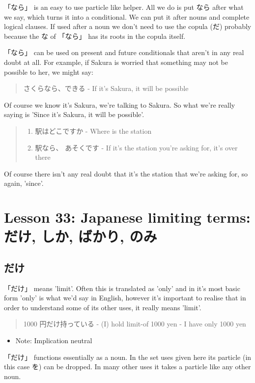 \documentclass[11pt]{article}
\begin{document}
「なら」 is an easy to use particle like helper. All we do is put なら after what we say, which turns it into a conditional. We can put it after nouns and complete logical clauses. If used after a noun we don't need to use the copula (だ) probably because the な of 「なら」 has its roots in the copula itself.

「なら」 can be used on present and future conditionals that aren't in any real doubt at all. For example, if Sakura is worried that something may not be possible to her, we might say:
\begin{quote}
さくらなら、できる - If it's Sakura, it will be possible
\end{quote}
Of course we know it's Sakura, we're talking to Sakura. So what we're really saying is 'Since it's Sakura, it will be possible'.
\begin{quote}
\begin{enumerate}
\item 駅はどこですか - Where is the station
\item 駅なら、 あそくです - If it's the station you're asking for, it's over there
\end{enumerate}
\end{quote}
Of course there isn't any real doubt that it's the station that we're asking for, so again, 'since'.

\section{Lesson 33: Japanese limiting terms: だけ, しか, ばかり, のみ}
\label{sec:org63bd4e3}
\subsection{だけ}
\label{sec:orgbf3196c}
「だけ」 means 'limit'. Often this is translated as 'only' and in it's most basic form 'only' is what we'd say in English, however it's important to realise that in order to understand some of its other uses, it really means 'limit'.
\begin{quote}
1000 円だけ持っている - (I) hold limit-of 1000 yen - I have only 1000 yen
\end{quote}
\begin{itemize}
\item Note: Implication neutral
\end{itemize}
「だけ」 functions essentially as a noun. In the set uses given here its particle (in this case を) can be dropped. In many other uses it takes a particle like any other noun.
\end{document}
